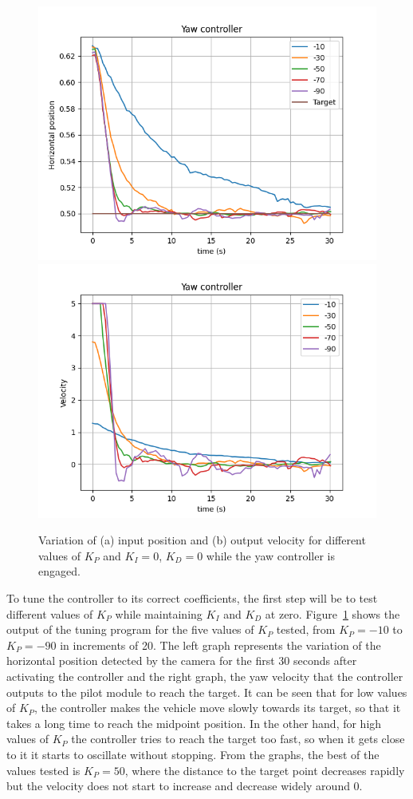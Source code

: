 \begin{figure}
  \centering
  \includegraphics[width=.45\linewidth]{img/pid/yaw/yaw_pos_prop_i0_d0.png}
  \includegraphics[width=.45\linewidth]{img/pid/yaw/yaw_vel_prop_i0_d0.png}
  \caption{Variation of (a) input position and (b) output velocity for different values of $K_{P}$ and $K_I=0$, $K_D=0$ while the yaw controller is engaged.}\label{fig:tune-yaw-prop}
\end{figure}

To tune the controller to its correct coefficients, the first step will be to test different values of $K_{P}$ while maintaining $K_{I}$ and $K_{D}$ at zero.
Figure~\ref{fig:tune-yaw-prop} shows the output of the tuning program for the five values of $K_{P}$ tested, from $K_P=-10$ to $K_P=-90$ in increments of 20.
The left graph represents the variation of the horizontal position detected by the camera for the first 30 seconds after activating the controller and the right graph, the yaw velocity that the controller outputs to the pilot module to reach the target.
It can be seen that for low values of $K_{P}$, the controller makes the vehicle move slowly towards its target, so that it takes a long time to reach the midpoint position.
In the other hand, for high values of $K_{P}$ the controller tries to reach the target too fast, so when it gets close to it it starts to oscillate without stopping.
From the graphs, the best of the values tested is $K_{P}=50$, where the distance to the target point decreases rapidly but the velocity does not start to increase and decrease widely around 0.

